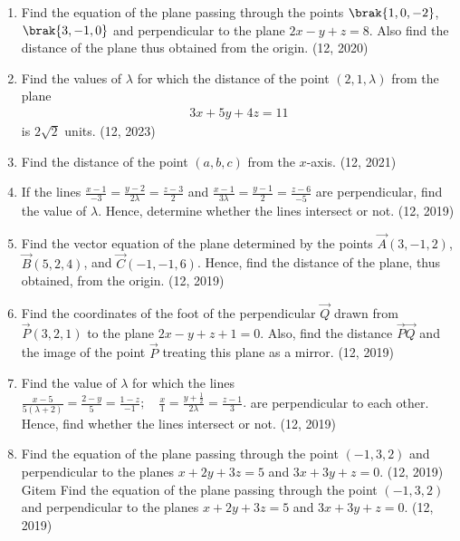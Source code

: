 \begin{enumerate}[label=\thesubsection.\arabic*, ref=\thesubsection.\theenumi]
\item Find the equation of the plane passing through the points $\brak{1, 0, -2}$,  $\brak{3, -1, 0}$ and perpendicular to the plane $2x - y + z = 8$. Also find the distance of the plane thus obtained from the origin.
\hfill (12, 2020)
    \item Find the values of $\lambda$ for which the distance of the point $(2, 1, \lambda)$ from the plane
    \begin{align}
        3x + 5y + 4z = 11
    \end{align}
    is $2\sqrt{2}$ units.
    \hfill (12, 2023)
	\item Find the distance of the point $(a, b, c)$ from the $x$-axis. \hfill (12, 2021)
	\item If the lines $\frac{x-1}{-3} = \frac{y-2}{2\lambda} = \frac{z-3}{2}$ and $\frac{x-1}{3\lambda} = \frac{y-1}{2} = \frac{z-6}{-5}$ are perpendicular, find the value of $\lambda$. Hence, determine whether the lines intersect or not. \hfill (12, 2019)
	\item Find the vector equation of the plane determined by the points $\vec{A}(3, -1, 2)$, $\vec{B}(5, 2, 4)$, and $\vec{C}(-1, -1, 6)$. Hence, find the distance of the plane, thus obtained, from the origin. \hfill (12, 2019)
	\item Find the coordinates of the foot of the perpendicular $\vec{Q}$ drawn from $\vec{P}(3, 2, 1)$ to the plane $2x - y + z + 1 = 0$. Also, find the distance $\vec{P}\vec{Q}$ and the image of the point $\vec{P}$ treating this plane as a mirror. \hfill (12, 2019)
	\item Find the value of $\lambda$ for which the lines $\frac{x-5}{5(\lambda+2)} = \frac{2-y}{5} = \frac{1-z}{-1}; \quad \frac{x}{1} = \frac{y + \frac{1}{2}}{2\lambda} = \frac{z-1}{3}.$ are perpendicular to each other.
	Hence, find whether the lines intersect or not. \hfill (12, 2019)
	\item Find the equation of the plane passing through the point $(-1, 3, 2)$ and perpendicular to the planes $x + 2y + 3z = 5$ and $3x + 3y + z = 0$. \hfill (12, 2019)
	Gitem Find the equation of the plane passing through the point $(-1, 3, 2)$ and perpendicular to the planes $x + 2y + 3z = 5$ and $3x + 3y + z = 0$. \hfill (12, 2019)
	

\end{enumerate}

